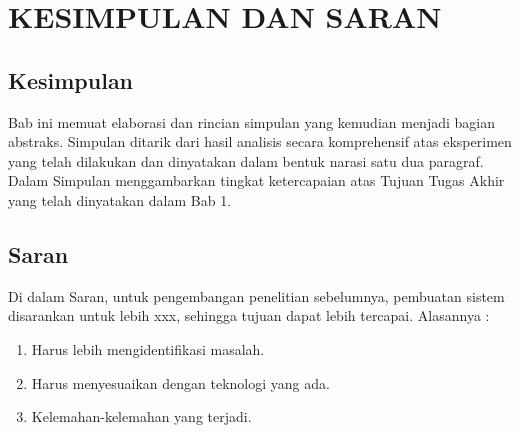 \chapter{KESIMPULAN DAN SARAN}

\label{bab:kesimpulan-dan-saran}

\section{Kesimpulan}

Bab ini memuat elaborasi dan rincian simpulan yang kemudian menjadi bagian abstraks. Simpulan ditarik dari hasil analisis secara komprehensif atas eksperimen yang telah dilakukan dan dinyatakan dalam bentuk narasi satu dua paragraf. Dalam Simpulan menggambarkan tingkat ketercapaian atas Tujuan Tugas Akhir yang telah dinyatakan dalam Bab 1.

\section{Saran}

Di dalam Saran, untuk pengembangan penelitian sebelumnya, pembuatan sistem disarankan untuk lebih xxx, sehingga tujuan dapat lebih tercapai. Alasannya :

\begin{enumerate}[series=word32level0,label=\alph*.]

\item Harus lebih mengidentifikasi masalah.

\item Harus menyesuaikan dengan teknologi yang ada.

\item Kelemahan-kelemahan yang terjadi.

\end{enumerate}
